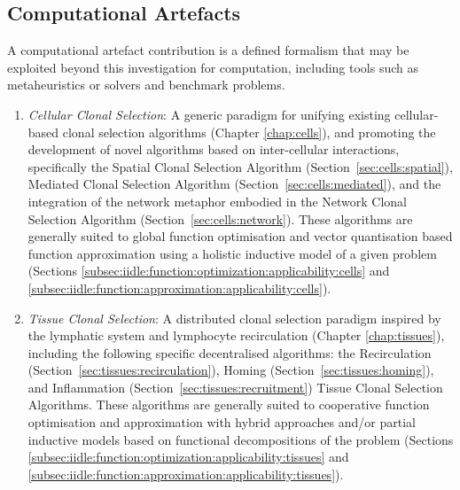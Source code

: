 %
%
\subsection{Computational Artefacts}
A computational artefact contribution is a defined formalism that may be exploited beyond this investigation for computation, including tools such as metaheuristics or solvers and benchmark problems.

\begin{enumerate}

	\item \emph{Cellular Clonal Selection}: A generic paradigm for unifying existing cellular-based clonal selection algorithms (Chapter \ref{chap:cells}), and promoting the development of novel algorithms based on inter-cellular interactions, specifically the Spatial Clonal Selection Algorithm (Section~\ref{sec:cells:spatial}), Mediated Clonal Selection Algorithm (Section~\ref{sec:cells:mediated}), and the integration of the network metaphor embodied in the Network Clonal Selection Algorithm (Section~\ref{sec:cells:network}). These algorithms are generally suited to global function optimisation and vector quantisation based function approximation using a holistic inductive model of a given problem (Sections \ref{subsec:iidle:function:optimization:applicability:cells} and \ref{subsec:iidle:function:approximation:applicability:cells}).
	
	\item \emph{Tissue Clonal Selection}: A distributed clonal selection paradigm inspired by the lymphatic system and lymphocyte recirculation (Chapter \ref{chap:tissues}), including the following specific decentralised algorithms: the Recirculation (Section~\ref{sec:tissues:recirculation}), Homing (Section~\ref{sec:tissues:homing}), and Inflammation (Section~\ref{sec:tissues:recruitment}) Tissue Clonal Selection Algorithms. These algorithms are generally suited to cooperative function optimisation and approximation with hybrid approaches and/or partial inductive models based on functional decompositions of the problem (Sections \ref{subsec:iidle:function:optimization:applicability:tissues} and \ref{subsec:iidle:function:approximation:applicability:tissues}).


\end{enumerate}
